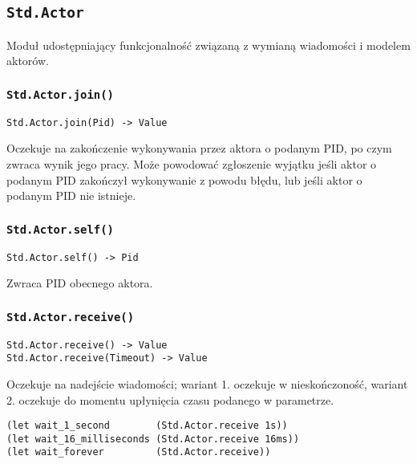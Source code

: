 \subsection{\texttt{Std.Actor}}
\label{stdlib_Std_Actor}

Moduł udostępniający funkcjonalność związaną z wymianą wiadomości i modelem aktorów.

\subsubsection{\texttt{Std.Actor.join()}}
\label{Std_Actor_join}

\begin{small}
\begin{lstlisting}
Std.Actor.join(Pid) -> Value
\end{lstlisting}
\end{small}

Oczekuje na zakończenie wykonywania przez aktora o podanym PID, po czym zwraca wynik jego pracy.
Może powodować zgłoszenie wyjątku jeśli aktor o podanym PID zakończył wykonywanie z powodu błędu, lub jeśli aktor
o podanym PID nie istnieje.

\subsubsection{\texttt{Std.Actor.self()}}

\begin{small}
\begin{lstlisting}
Std.Actor.self() -> Pid
\end{lstlisting}
\end{small}

Zwraca PID obecnego aktora.

\subsubsection{\texttt{Std.Actor.receive()}}

\begin{small}
\begin{lstlisting}
Std.Actor.receive() -> Value
Std.Actor.receive(Timeout) -> Value
\end{lstlisting}
\end{small}

Oczekuje na nadejście wiadomości; wariant 1. oczekuje w nieskończoność,
wariant 2. oczekuje do momentu upłynięcia czasu podanego w parametrze.

\begin{small}
\begin{lstlisting}
(let wait_1_second        (Std.Actor.receive 1s))
(let wait_16_milliseconds (Std.Actor.receive 16ms))
(let wait_forever         (Std.Actor.receive))
\end{lstlisting}
\end{small}

